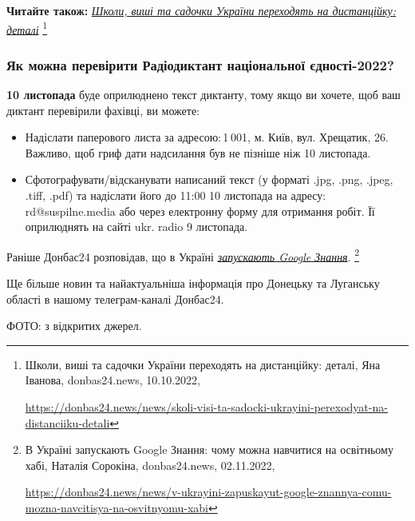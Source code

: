 \textbf{Читайте також:} \href{https://donbas24.news/news/skoli-visi-ta-sadocki-ukrayini-perexodyat-na-distanciiku-detali}{\emph{Школи, виші та садочки України переходять на дистанційку: деталі}}%
\footnote{Школи, виші та садочки України переходять на дистанційку: деталі, Яна Іванова, donbas24.news, 10.10.2022, \par%
\url{https://donbas24.news/news/skoli-visi-ta-sadocki-ukrayini-perexodyat-na-distanciiku-detali}%
}

\subsubsection{Як можна перевірити Радіодиктант національної єдності-2022?}


\textbf{10 листопада} буде оприлюднено текст диктанту, тому якщо ви хочете, щоб ваш
диктант перевірили фахівці, ви можете:

\begin{itemize} %
\item Надіслати паперового листа за адресою: 1 001, м. Київ, вул. Хрещатик,
26.  Важливо, щоб гриф дати надсилання був не пізніше ніж 10 листопада.

\item Сфотографувати/відсканувати написаний текст (у форматі .jpg, .png, .jpeg,
.tiff, .pdf) та надіслати його до 11:00 10 листопада на адресу:
rd@suspilne.media або через електронну форму для отримання робіт. Її
оприлюднять на сайті ukr. radio 9 листопада.
\end{itemize} %

Раніше Донбас24 розповідав, що в Україні \href{https://donbas24.news/news/v-ukrayini-zapuskayut-google-znannya-comu-mozna-navcitisya-na-osvitnyomu-xabi}{\emph{запускають Google Знання}}.%
\footnote{В Україні запускають Google Знання: чому можна навчитися на освітньому хабі, Наталія Сорокіна, donbas24.news, 02.11.2022, \par\url{https://donbas24.news/news/v-ukrayini-zapuskayut-google-znannya-comu-mozna-navcitisya-na-osvitnyomu-xabi}}

Ще більше новин та найактуальніша інформація про Донецьку та Луганську області
в нашому телеграм-каналі Донбас24.

ФОТО: з відкритих джерел.

